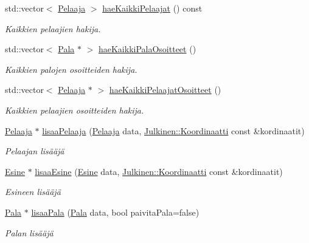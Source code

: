 \begin{DoxyCompactItemize}
std\+::vector$<$ \hyperlink{class_pelaaja}{Pelaaja} $>$ \hyperlink{class_data_a2b22700aa0ab25293f1cbe7430bea8c0}{hae\+Kaikki\+Pelaajat} () const 
\begin{DoxyCompactList}\small\item\em Kaikkien pelaajien hakija. \end{DoxyCompactList}\item 
std\+::vector$<$ \hyperlink{class_pala}{Pala} $\ast$ $>$ \hyperlink{class_data_ad4c590c292ffe3c1ab7fd5d7d18d9a03}{hae\+Kaikki\+Pala\+Osoitteet} ()
\begin{DoxyCompactList}\small\item\em Kaikkien palojen osoitteiden hakija. \end{DoxyCompactList}\item 
std\+::vector$<$ \hyperlink{class_pelaaja}{Pelaaja} $\ast$ $>$ \hyperlink{class_data_a74e2cf4cbcff5ea1159b91a2b40819bc}{hae\+Kaikki\+Pelaajat\+Osoitteet} ()
\begin{DoxyCompactList}\small\item\em Kaikkien pelaajien osoitteiden hakija. \end{DoxyCompactList}\item 
\hyperlink{class_pelaaja}{Pelaaja} $\ast$ \hyperlink{class_data_a81cc329ff5e8eda227acebd612147e2e}{lisaa\+Pelaaja} (\hyperlink{class_pelaaja}{Pelaaja} data, \hyperlink{class_julkinen_1_1_koordinaatti}{Julkinen\+::\+Koordinaatti} const \&kordinaatit)
\begin{DoxyCompactList}\small\item\em Pelaajan lisääjä \end{DoxyCompactList}\item 
\hyperlink{class_esine}{Esine} $\ast$ \hyperlink{class_data_ad9d038278b49a80ef5bb571a5eff248f}{lisaa\+Esine} (\hyperlink{class_esine}{Esine} data, \hyperlink{class_julkinen_1_1_koordinaatti}{Julkinen\+::\+Koordinaatti} const \&kordinaatit)
\begin{DoxyCompactList}\small\item\em Esineen lisääjä \end{DoxyCompactList}\item 
\hyperlink{class_pala}{Pala} $\ast$ \hyperlink{class_data_a7d19ebd5e1eb95e001c516ad9807ce74}{lisaa\+Pala} (\hyperlink{class_pala}{Pala} data, bool paivita\+Pala=false)
\begin{DoxyCompactList}\small\item\em Palan lisääjä \end{DoxyCompactList}\item 

\end{DoxyCompactItemize}
